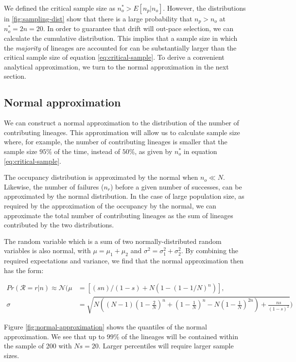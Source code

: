 \documentclass[review]{elsarticle}
\begin{document}
We defined the critical sample size as $n_o^* > E[n_p | n_o]$. However, the distributions in
\ref{fig:sampling-dist} show that there is a large probability that $n_p>n_o$ at $n_o^*=2n=20$. In
order to guarantee that drift will out-pace selection, we can calculate the cumulative distribution.
This implies that a sample size in which the \textit{majority} of lineages are accounted for can be
substantially larger than the critical sample size of equation \eqref{eq:critical-sample}. To derive
a convenient analytical approximation, we turn to the normal approximation in the next section.

\subsection{Normal approximation}

We can construct a normal approximation to the distribution of the number of contributing lineages.
This approximation will allow us to calculate sample size where, for example, the number of
contributing lineages is smaller that the sample size $95\%$ of the time, instead of $50\%$, as
given by $n_o^*$ in equation \eqref{eq:critical-sample}.

The occupancy distribution is approximated by the normal \citep{ONeill2019} when $n_o \ll N$.
Likewise, the number of failures ($n_r$) before a given number of successes, can be approximated by
the normal distribution. In the case of large population size, as required by the approximation of
the occupancy by the normal, we can approximate the total number of contributing lineages as the sum
of lineages contributed by the two distributions.

The random variable which is a sum of two normally-distributed random variables is also normal, with
$\mu=\mu_1+\mu_2$ and $\sigma^2 = \sigma^2_1 + \sigma^2_2$. By combining the required expectations
and variance, we find that the normal approximation then has the form:

\begin{align}
  \label{eq:normal-approximation}
  Pr(\mathcal{R}=r|n) \approx \mathcal{N}( \mu &= \left[(s n)/(1 - s) + N (1 - (1 - 1/N)^n)\right],\\
  \sigma &= \sqrt{N \left((N-1) \left(1-\frac{2}{N}\right)^n+\left(1-\frac{1}{N}\right)^n-N\left(1-\frac{1}{N}\right)^{2 n}\right)+\frac{n s}{(1-s)^2}})
\end{align}

Figure \ref{fig:normal-approximation} shows the quantiles of the normal approximation. We see that
up to $99\%$ of the lineages will be contained within the sample of 200 with $Ns=20$. Larger
percentiles will require larger sample sizes.
\end{document}
